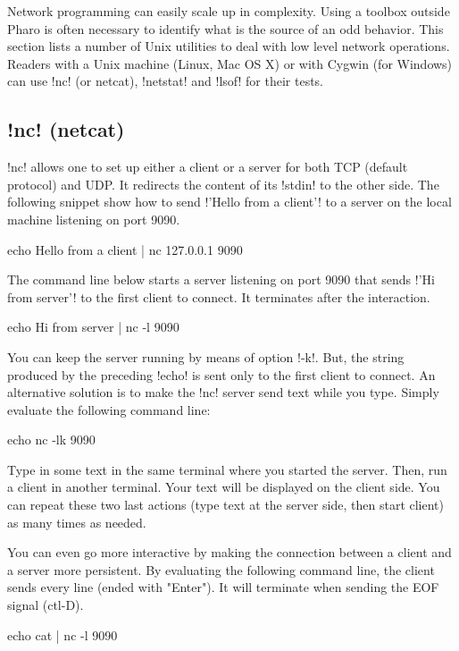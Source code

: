 \documentclass[a4paper,10pt,twoside]{book}
\begin{document}
Network programming can easily scale up in complexity. Using a toolbox outside Pharo is often necessary to identify what is the source of an odd behavior. This section lists a number of Unix utilities to deal with low level network operations.
Readers with a Unix machine (Linux, Mac OS X) or with Cygwin (for Windows) can use \ct!nc! (or netcat), \ct!netstat! and \ct!lsof! for their tests.

\subsection{\ct!nc! (netcat)}\label{sec:netcat}
\ct!nc! allows one to set up either a client or a server for both TCP (default protocol) and UDP.
It redirects the content of its \ct!stdin! to the other side.
The following snippet show how to send \ct!'Hello from a client'! to a server on the local machine listening on port 9090.
\begin{code}{}
echo Hello from a client | nc 127.0.0.1 9090 
\end{code}

The command line below starts a server listening on port 9090 that sends \ct!'Hi from server'! to the first client to connect.
It terminates after the interaction.
\begin{code}{}
echo Hi from server | nc -l 9090 
\end{code}

You can keep the server running by means of option \ct!-k!.
But, the string produced by the preceding \ct!echo! is sent only to the first client to connect.
An alternative solution is to make the \ct!nc! server send text while you type.
Simply evaluate the following command line:
\begin{code}{}
echo nc -lk 9090 
\end{code}

Type in some text in the same terminal where you started the server.
Then, run a client in another terminal.
Your text will be displayed on the client side.
You can repeat these two last actions (type text at the server side, then start client) as many times as needed.

You can even go more interactive by making the connection between a client and a server more persistent.
By evaluating the following command line, the client sends every line (ended with "Enter").
It will terminate when sending the EOF signal (ctl-D).
\begin{code}{}
echo cat | nc -l 9090 
\end{code}
\end{document}
